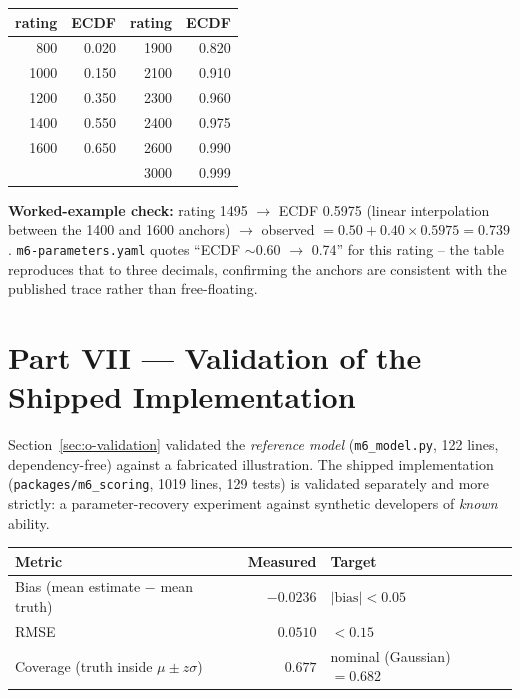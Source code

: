 \documentclass[10pt,a4paper]{article}
\begin{document}
\begin{center}\small
\begin{tabular}{@{}rrrr@{}}
\toprule
rating & ECDF & \qquad rating & ECDF \\
\midrule
800  & 0.020 & 1900 & 0.820 \\
1000 & 0.150 & 2100 & 0.910 \\
1200 & 0.350 & 2300 & 0.960 \\
1400 & 0.550 & 2400 & 0.975 \\
1600 & 0.650 & 2600 & 0.990 \\
\multicolumn{2}{r}{} & 3000 & 0.999 \\
\bottomrule
\end{tabular}
\end{center}

\textbf{Worked-example check:} rating 1495 $\to$ ECDF 0.5975 (linear
interpolation between the 1400 and 1600 anchors) $\to$ observed
$=0.50+0.40\times0.5975=0.739$. \texttt{m6-parameters.yaml} quotes ``ECDF
$\sim$0.60 $\to$ 0.74'' for this rating -- the table reproduces that to
three decimals, confirming the anchors are consistent with the published
trace rather than free-floating.

\section{Part VII --- Validation of the Shipped Implementation}

Section~\ref{sec:o-validation} validated the \emph{reference model}
(\texttt{m6\_model.py}, 122 lines, dependency-free) against a fabricated
illustration. The shipped implementation (\texttt{packages/m6\_scoring},
1019 lines, 129 tests) is validated separately and more strictly: a
parameter-recovery experiment against synthetic developers of \emph{known}
ability.

\begin{center}\small
\begin{tabular}{@{}lrl@{}}
\toprule
\textbf{Metric} & \textbf{Measured} & \textbf{Target} \\
\midrule
Bias (mean estimate $-$ mean truth) & $-0.0236$ & $|\text{bias}|<0.05$ \\
RMSE                                & $0.0510$  & $<0.15$ \\
Coverage (truth inside $\mu\pm z\sigma$) & $0.677$ & nominal (Gaussian) $=0.682$ \\
\bottomrule
\end{tabular}
\end{center}
\end{document}
